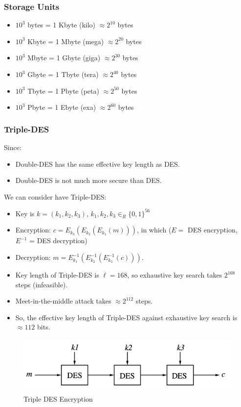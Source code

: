 \documentclass[12pt,titlepage]{article}
\begin{document}
\subsubsection{Storage Units}
\begin{itemize}
	\item $10^3$ bytes = 1 Kbyte (kilo) $\approx 2^{10}$ bytes
	\item $10^3$ Kbyte = 1 Mbyte (mega) $\approx 2^{20}$ bytes
	\item $10^3$ Mbyte = 1 Gbyte (giga) $\approx 2^{30}$ bytes
	\item $10^3$ Gbyte = 1 Tbyte (tera) $\approx 2^{40}$ bytes
	\item $10^3$ Tbyte = 1 Pbyte (peta) $\approx 2^{50}$ bytes
	\item $10^3$ Pbyte = 1 Ebyte (exa) $\approx 2^{60}$ bytes
\end{itemize}

\subsubsection{Triple-DES}

Since: \begin{itemize}
\item Double-DES has the same effective key length as DES.
\item Double-DES is not much more secure than DES.
\end{itemize}

We can consider have Triple-DES: \begin{itemize}
\item Key is $k = (k_1 , k_2 , k_3 )$, $k_1, k_2, k_3 \in_R \{0, 1\}^{56}$
\item Encryption: $c = E_{k_3} (E_{k_2} (E_{k_1} (m)))$, in which ($E =$ DES encryption, $E^{-1}$ = DES decryption)
\item Decryption: $m = E_{k_1}^{-1}(E_{k_2}^{-1} (E_{k_3}^{-1}(c)))$.
\item Key length of Triple-DES is $\ell = 168$, so exhaustive key search takes $2^{168}$ steps (infeasible).
\item Meet-in-the-middle attack takes $\approx 2^{112}$ steps.
\item So, the effective key length of Triple-DES against exhaustive key search is $\approx 112$ bits.
\end{itemize}

\begin{center}
	\begin{figure}[h!]
		\includegraphics[width=\textwidth]{Triple_DES.png}
		\caption{Triple DES Encryption}
	\end{figure}
\end{center}
\newpage
\end{document}
